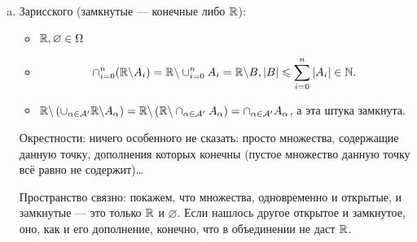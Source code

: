 \documentclass[12pt, a4paper]{article}
\begin{document}
\begin{enumerate}[(a)]
    \item Зарисского (замкнутые — конечные либо ${\mathbb{R}}$): 
    
    \begin{itemize}
        \item ${\mathbb{R}}, \varnothing \in \Omega$
        \item \begin{equation}
            \cap_{i = 0}^n ({\mathbb{R}} \backslash A_i) = {\mathbb{R}} \backslash \cup_{i = 0}^n A_i = {\mathbb{R}} \backslash B, |B| \leqslant \sum_{i = 0}^{n} |A_i| \in {\mathbb{N}}.
        \end{equation}
        \item
        ${\mathbb{R}} \backslash \left( \cup_{\alpha \in \mathcal{A'}} {\mathbb{R}} \backslash A_\alpha \right) = {\mathbb{R}} \backslash \left( {\mathbb{R}} \backslash \cap_{\alpha \in \mathcal{A'}} A_\alpha \right) = \cap_{\alpha \in \mathcal{A'}} A_\alpha$, а эта штука замкнута.
    \end{itemize}
    
    Окрестности: ничего особенного не сказать: просто множества, содержащие данную точку, дополнения которых конечны (пустое множество данную точку всё равно не содержит)…

    Пространство связно: покажем, что множества, одновременно и открытые, и замкнутые — это только ${\mathbb{R}}$ и $\varnothing$.
    Если нашлось другое открытое и замкнутое, оно, как и его дополнение, конечно, что в объединении не даст ${\mathbb{R}}$.
\end{enumerate}
\end{document}
